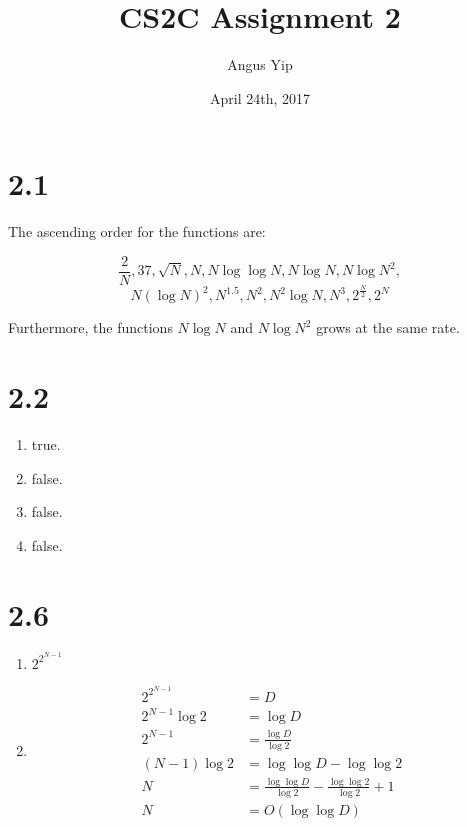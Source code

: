 \documentclass{article}
\title{CS2C Assignment 2}
\author{Angus Yip}
\date{April 24th, 2017}
\begin{document}
\maketitle

\section*{2.1}

    The ascending order for the functions are: 
    
    \[ \frac{2}{N}, 37, \sqrt{N}, N, N\log{\log{N}}, N\log{N}, N\log{N^2}, \]
    \[ N(\log{N})^2, N^{1.5}, N^2, N^2\log{N}, N^3, 2^\frac{N}{2}, 2^N \]
    
    \noindent Furthermore, the functions \( N\log{N} \) and \( N\log{N^2} \) 
    grows at the same rate.

\section*{2.2}
    \renewcommand{\labelenumi}{\alph{enumi}}
    \begin{enumerate}
        \item true.
        \item false.
        \item false.
        \item false.
    \end{enumerate}

\section*{2.6}
    \begin{enumerate}
        \item \( 2^{2^{N - 1}} \)
        \item 
            \begin{equation*} 
            \begin{split}
                2^{2^{N - 1}} & = D \\
                2^{N - 1}\log{2} & = \log{D}\\
                2^{N - 1} & = \frac{\log{D}}{\log{2}}\\
                (N - 1)\log{2} & = \log{\log{D}} - \log{\log{2}}\\
                N & = \frac{\log{\log{D}}}{\log{2}} - \frac{\log{\log{2}}}{\log{2}} + 1\\
                N & = O(\log{\log{D}})
            \end{split}
            \end{equation*}
    
    
    \end{enumerate}
\end{document}
